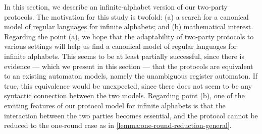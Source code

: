 In this section, we describe an infinite-alphabet version of our two-party protocols.
The motivation for this study is twofold: (a) a search for a canonical model of regular languages for infinite alphabets; and (b) mathematical interest. Regarding the point (a), we hope that the adaptability of two-party protocols to various settings will help us  find a canonical model of regular languages for infinite alphabets. This seems to be at least partially successful, since there is evidence --- which we present in this section --- that the protocols are equivalent to an existing automaton models, namely the unambiguous register automaton. If true, this equivalence would be unexpected, since there does not seem to be any syntactic connection between the two models. Regarding point (b), one of the exciting features of our protocol model for infinite alphabets is that the interaction between the two parties becomes essential, and the protocol cannot be reduced to the one-round case as in \cref{lemma:one-round-reduction-general}.

